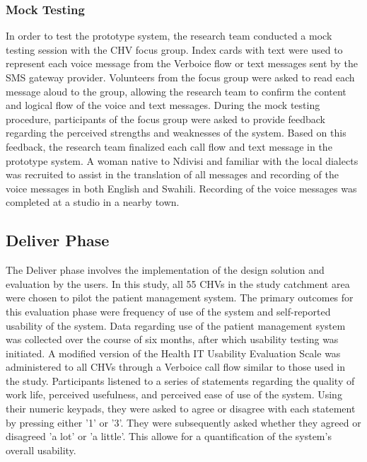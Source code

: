 \subsubsection{Mock Testing}
In order to test the prototype system, the research team conducted a mock testing session with the CHV focus group. Index cards with text were used to represent each voice message from the Verboice flow or text messages sent by the SMS gateway provider. Volunteers from the focus group were asked to read each message aloud to the group, allowing the research team to confirm the content and logical flow of the voice and text messages. During the mock testing procedure, participants of the focus group were asked to provide feedback regarding the perceived strengths and weaknesses of the system. Based on this feedback, the research team finalized each call flow and text message in the prototype system. A woman native to Ndivisi and familiar with the local dialects was recruited to assist in the translation of all messages and recording of the voice messages in both English and Swahili. Recording of the voice messages was completed at a studio in a nearby town. 

\subsection{Deliver Phase}
The Deliver phase involves the implementation of the design solution and evaluation by the users. In this study, all 55 CHVs in the study catchment area were chosen to pilot the patient management system. The primary outcomes for this evaluation phase were frequency of use of the system and self-reported usability of the system. Data regarding use of the patient management system was collected over the course of six months, after which usability testing was initiated. A modified version of the Health IT Usability Evaluation Scale \citep{Yen2010} was administered to all CHVs through a Verboice call flow similar to those used in the study. Participants listened to a series of statements regarding the quality of work life, perceived usefulness, and perceived ease of use of the system. Using their numeric keypads, they were asked to agree or disagree with each statement by pressing either '1' or '3'. They were subsequently asked whether they agreed or disagreed 'a lot' or 'a little'. This allowe for a quantification of the system's overall usability.




































